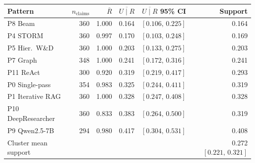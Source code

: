 \begin{tabular}{lrrrrr}
\toprule
Pattern & $n_{\mathrm{claims}}$ & $\overline{R}$ & $\overline{U\mid R}$ & $\overline{U\mid R}$ 95\% CI & Support\\
\midrule
P8 Beam & 360 & 1.000 & 0.164 & $[0.106,\,0.225]$ & 0.164\\
P4 STORM & 360 & 0.997 & 0.170 & $[0.103,\,0.248]$ & 0.169\\
P5 Hier.\ W\&D & 360 & 1.000 & 0.203 & $[0.133,\,0.275]$ & 0.203\\
P7 Graph & 348 & 1.000 & 0.241 & $[0.172,\,0.316]$ & 0.241\\
P11 ReAct & 300 & 0.920 & 0.319 & $[0.219,\,0.417]$ & 0.293\\
P0 Single-pass & 354 & 0.983 & 0.325 & $[0.244,\,0.411]$ & 0.319\\
P1 Iterative RAG & 360 & 1.000 & 0.328 & $[0.247,\,0.408]$ & 0.328\\
P10 DeepResearcher & 360 & 0.833 & 0.383 & $[0.264,\,0.500]$ & 0.319\\
P9 Qwen2.5-7B & 294 & 0.980 & 0.417 & $[0.304,\,0.531]$ & 0.408\\
\midrule
Cluster mean support & & & & & 0.272 $[0.221,\,0.321]$\\
\bottomrule
\end{tabular}
